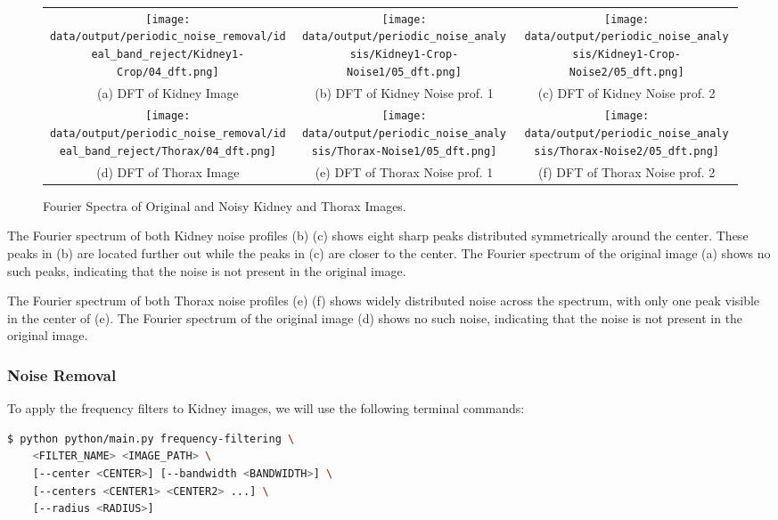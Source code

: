\documentclass[a4paper,12pt]{article}
\begin{document}
\begin{figure}[hbtp]
    \begin{tabular}{ccc}
        \texttt{[image: data/output/periodic\_noise\_removal/ideal\_band\_reject/Kidney1-Crop/04\_dft.png]} &
        \texttt{[image: data/output/periodic\_noise\_analysis/Kidney1-Crop-Noise1/05\_dft.png]} &
        \texttt{[image: data/output/periodic\_noise\_analysis/Kidney1-Crop-Noise2/05\_dft.png]} \\
        (a) DFT of Kidney Image & (b) DFT of Kidney Noise prof. 1 & (c) DFT of Kidney Noise prof. 2 \\
        \texttt{[image: data/output/periodic\_noise\_removal/ideal\_band\_reject/Thorax/04\_dft.png]} &
        \texttt{[image: data/output/periodic\_noise\_analysis/Thorax-Noise1/05\_dft.png]} &
        \texttt{[image: data/output/periodic\_noise\_analysis/Thorax-Noise2/05\_dft.png]} \\
        (d) DFT of Thorax Image & (e) DFT of Thorax Noise prof. 1 & (f) DFT of Thorax Noise prof. 2 \\
    \end{tabular}
    \caption{\label{fig:noise-profiles} Fourier Spectra of Original and Noisy Kidney and Thorax Images.}
\end{figure}

The Fourier spectrum of both Kidney noise profiles (b) (c) shows eight sharp peaks distributed symmetrically around the center. These peaks in (b) are located further out while the peaks in (c) are closer to the center. The Fourier spectrum of the original image (a) shows no such peaks, indicating that the noise is not present in the original image.

The Fourier spectrum of both Thorax noise profiles (e) (f) shows widely distributed noise across the spectrum, with only one peak visible in the center of (e). The Fourier spectrum of the original image (d) shows no such noise, indicating that the noise is not present in the original image.

\subsubsection{Noise Removal}

To apply the frequency filters to Kidney images, we will use the following terminal commands:

\begin{lstlisting}[language=bash]
$ python python/main.py frequency-filtering \
    <FILTER_NAME> <IMAGE_PATH> \
    [--center <CENTER>] [--bandwidth <BANDWIDTH>] \
    [--centers <CENTER1> <CENTER2> ...] \
    [--radius <RADIUS>]
\end{lstlisting}
\end{document}
